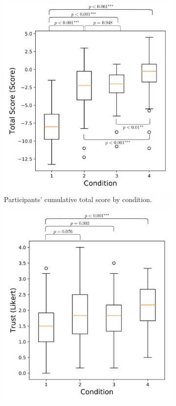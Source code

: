 \begin{figure}[tbp]
\begin{subfigure}[b]{0.30\linewidth}
        \includegraphics[width=1.0\linewidth]{Figures/total_score_box.png}
        \caption{Participants' cumulative total score by condition.}
        \label{fig:score_box}
    \end{subfigure} 
    \hfill
    \begin{subfigure}[b]{0.30\linewidth}
        \centering
        \includegraphics[width=1.0\linewidth]{Figures/trust_box.png}

\end{subfigure}
\end{figure}
